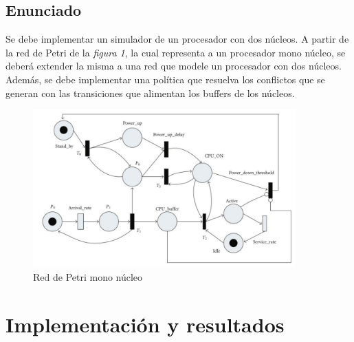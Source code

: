 \documentclass{article}
\begin{document}
    \subsection{Enunciado}
    \begin{flushleft}
        Se debe implementar un simulador de un procesador con dos núcleos. A partir de la red de
        Petri de la \emph{figura 1}, la cual representa a un procesador mono núcleo, se deberá 
        extender la misma a una red que modele un procesador con dos núcleos. Además, se debe
        implementar una política que resuelva los conflictos que se generan con las transiciones
        que alimentan los buffers de los núcleos.
    \end{flushleft}
    \begin{figure}[h]
        \includegraphics[width=0.9\textwidth, center]{rdp_enun.png}
        \caption{Red de Petri mono núcleo}
    \end{figure} \newpage
    \section{Implementación y resultados}
\end{document}
